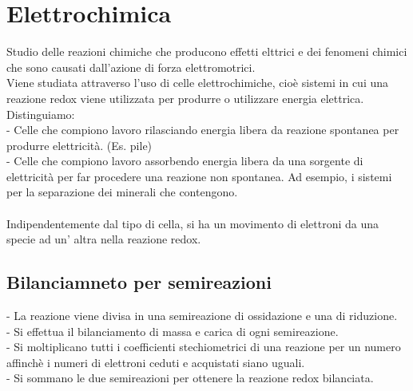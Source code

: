 \section{Elettrochimica}
Studio delle reazioni chimiche che producono effetti elttrici e dei fenomeni chimici che sono causati dall'azione di forza elettromotrici.\\
Viene studiata attraverso l'uso di celle elettrochimiche, cioè sistemi in cui una reazione redox viene utilizzata per produrre o utilizzare energia elettrica.\\
Distinguiamo:\\
\tab- Celle che compiono lavoro rilasciando energia libera da reazione spontanea per produrre elettricità. (Es. pile)\\
\tab- Celle che compiono lavoro assorbendo energia libera da una sorgente di elettricità per far procedere una reazione non spontanea. Ad esempio, i sistemi per la separazione dei minerali che contengono.\\\\
Indipendentemente dal tipo di cella, si ha un movimento di elettroni da una specie ad un' altra nella reazione redox.
\subsection{Bilanciamneto per semireazioni}
\tab- La reazione viene divisa in una semireazione di ossidazione e una di riduzione.\\
\tab- Si effettua il bilanciamento di massa e carica di ogni semireazione.\\
\tab- Si moltiplicano tutti i coefficienti stechiometrici di una reazione per un numero affinchè i numeri di elettroni ceduti e acquistati siano uguali.\\
\tab- Si sommano le due semireazioni per ottenere la reazione redox bilanciata.\\
